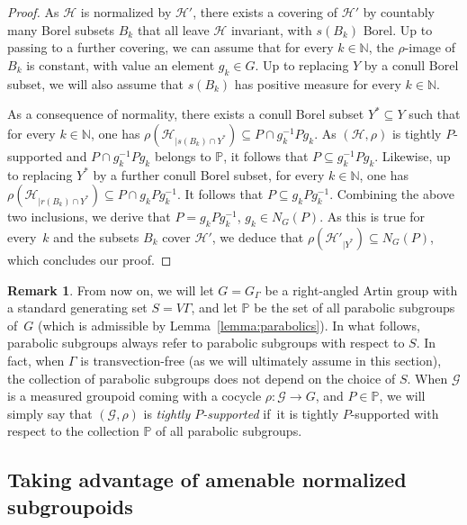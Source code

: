 \documentclass[JEP,XML,SOM,Unicode,NoFloatCountersInSection,published]{cedram}
\let\mathcal\mathscr
\theoremstyle{plain}
\theoremstyle{definition}
\newtheorem{rk}[theo]{Remark}
\newcommand{\calg}{\mathcal{G}}
\newcommand{\calh}{\mathcal{H}}
\begin{document}
\begin{proof}
As $\calh$ is normalized by $\calh'$, there exists a covering of $\calh'$ by countably many Borel subsets $B_k$ that all leave $\calh$ invariant, with $s(B_k)$ Borel. Up to passing to a further covering, we can assume that for every $k\in\mathbb{N}$, the $\rho$-image of $B_k$ is constant, with value an element $g_k\in G$. Up to replacing $Y$ by a conull Borel subset, we will also assume that $s(B_k)$ has positive measure for every $k\in\mathbb{N}$.

As a consequence of normality, there exists a conull Borel subset $Y^*\subseteq Y$ such that for every $k\in\mathbb{N}$, one has $\rho(\calh_{|s(B_k)\cap Y^*})\subseteq P\cap g_k^{-1}Pg_k$. As $(\calh,\rho)$ is tightly $P$\nobreakdash-sup\-ported and $P\cap g_k^{-1}Pg_k$ belongs to $\mathbb{P}$, it follows that $P\subseteq g_k^{-1}Pg_k$. Likewise, up to replacing $Y^*$ by a further conull Borel subset, for every $k\in\mathbb{N}$, one has $\rho(\calh_{|r(B_k)\cap Y^*})\!\subseteq\! P\cap g_kPg_k^{-1}$. It follows that $P\!\subseteq\! g_kPg_k^{-1}$. Combining the above two inclusions, we derive that $P\!=\!g_kPg_k^{-1}$, \ie $g_k\!\in\! N_G(P)$. As this is true for every~$k$ and the subsets $B_k$ cover $\calh'$, we deduce that $\rho(\calh'_{|Y^{\ast}}) \subseteq N_G(P)$, which concludes our proof.
\end{proof}

\begin{rk}\label{rk:support-raag}
From now on, we will let $G=G_\Gamma$ be a right-angled Artin group with a standard generating set $S=V\Gamma$, and let $\mathbb{P}$ be the set of all parabolic subgroups of~$G$ (which is admissible by Lemma~\ref{lemma:parabolics}). In what follows, parabolic subgroups always refer to parabolic subgroups with respect to $S$. In fact, when $\Gamma$ is transvection-free (as we will ultimately assume in this section), the collection of parabolic subgroups does not depend on the choice of $S$. When $\calg$ is a measured groupoid coming with a cocycle $\rho:\calg\to G$, and $P\in\mathbb{P}$, we will simply say that $(\calg,\rho)$ is \emph{tightly $P$-supported} if~it is tightly $P$-supported with respect to the collection $\mathbb{P}$ of all parabolic subgroups.
\end{rk}

\subsection{Taking advantage of amenable normalized subgroupoids}
\end{document}
